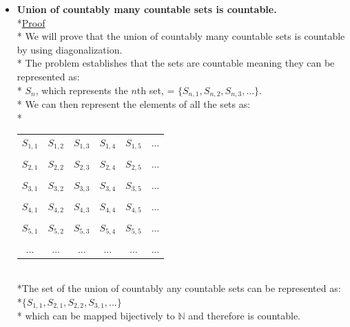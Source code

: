 \documentclass[12pt]{article}
\begin{document}
\begin{itemize}
\item \textbf{Union of countably many countable sets is countable.}
\bigskip
\\*\uline{Proof}
\bigskip
\\* We will prove that the union of countably many countable sets is countable by using diagonalization.
\medskip
\\* The problem establishes that the sets are countable meaning they can be represented as:
\\* $S_n$, which represents the $n$th set, = $\{S_{n, 1}, S_{n, 2}, S_{n, 3},...\}$.
\\* We can then represent the elements of all the sets as:
\\*\begin{tabular}{cccccc}
\\* $S_{1,1}$ & $S_{1, 2}$ & $S_{1,3}$ & $S_{1,4}$ & $S_{1,5}$ & ... \\
\\* $S_{2,1}$ & $S_{2, 2}$ & $S_{2,3}$ & $S_{2,4}$ & $S_{2,5}$ & ... \\
\\* $S_{3,1}$ & $S_{3, 2}$ & $S_{3,3}$ & $S_{3,4}$ & $S_{3,5}$ & ... \\
\\* $S_{4,1}$ & $S_{4, 2}$ & $S_{4,3}$ & $S_{4,4}$ & $S_{4,5}$ & ... \\
\\* $S_{5,1}$ & $S_{5, 2}$ & $S_{5,3}$ & $S_{5,4}$ & $S_{5,5}$ & ... \\
\\*  ... & ... & ... & ... & ... & ...\\
\end{tabular}
\bigskip
\\*The set of the union of countably any countable sets can be represented as:
\\*$\{S_{1,1}, S_{2,1}, S_{2,2}, S_{3,1},...\}$
\\* which can be mapped bijectively to $\mathbb{N}$ and therefore is countable.
\bigskip




\end{itemize}
\end{document}
